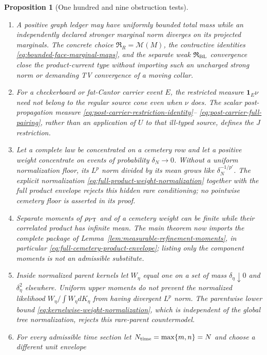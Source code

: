 \documentclass[11pt]{article}
\newtheorem{proposition}[theorem]{Proposition}
\newcommand{\one}{\mathbf 1}
\begin{document}
\begin{proposition}[One hundred and nine obstruction tests]
\begin{enumerate}[label=\textup{(T\arabic*)}]
      estimate.
\item A positive graph ledger may have uniformly bounded total mass while an
      independently declared stronger marginal norm diverges on its projected
      marginals.  The concrete choice
      $\mathfrak R_R=\mathcal M(M)$, the contractive identities
      \eqref{eq:bounded-face-marginal-maps}, and the separate weak
      $\mathfrak R_{\rm BL}$ convergence close the product-current type
      without importing such an uncharged strong norm or demanding TV
      convergence of a moving collar.
\item For a checkerboard or fat-Cantor carrier event $E$, the restricted
      measure $\one_E\nu$ need not belong to the regular source cone even
      when $\nu$ does.  The scalar post-propagation measure
      \eqref{eq:post-carrier-restriction-identity}--
      \eqref{eq:post-carrier-full-pairing}, rather than an application of
      $U$ to that ill-typed source, defines the $J$ restriction.
\item Let a complete law be concentrated on a cemetery row and let a
      positive weight concentrate on events of probability $\delta_N\to0$.
      Without a uniform normalization floor, its $L^p$ norm divided by its
      mean grows like $\delta_N^{-1/p'}$.  The explicit normalization
      \eqref{eq:full-product-weight-normalization} together with the full
      product envelope rejects this hidden rare conditioning; no pointwise
      cemetery floor is asserted in its proof.
\item Separate moments of $\rho_{\rm PT}$ and of a cemetery weight can be
      finite while their correlated product has infinite mean.  The main
      theorem now imports the complete package of
      Lemma~\ref{lem:measurable-refinement-moments}, in particular
      \eqref{eq:full-cemetery-product-envelope}; listing only the component
      moments is not an admissible substitute.
\item Inside normalized parent kernels let $W_\eta$ equal one on a set of
      mass $\delta_\eta\downarrow0$ and $\delta_\eta^2$ elsewhere.  Uniform
      upper moments do not prevent the normalized likelihood
      $W_\eta/\int W_\eta dK_\eta$ from having divergent $L^p$ norm.  The
      parentwise lower bound
      \eqref{eq:kernelwise-weight-normalization}, which is independent of the
      global tree normalization, rejects this rare-parent countermodel.
\item For every admissible time section let
      $N_{\rm time}=\max\{m,n\}=N$ and choose a different unit envelope

\end{enumerate}
\end{proposition}
\end{document}
